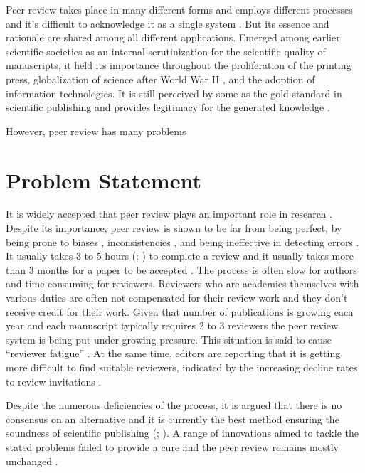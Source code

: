 Peer review takes place in many different forms and employs different processes and it’s difficult to acknowledge it as a single system \parencite[2]{HorbachS.P.J.M..2017}. But its essence and rationale are shared among all different applications. Emerged among earlier scientific societies as an internal scrutinization for the scientific quality of manuscripts, it held its importance throughout the proliferation of the printing press, globalization of science after World War II \parencite{Fyfe.2017}, and the adoption of information technologies. It is still perceived by some as the gold standard in scientific publishing \parencite{Mayden.2012} and provides legitimacy for the generated knowledge \parencite{Tennant.2020c}.

However, peer review has many problems 

\section{Problem Statement} \label{sec:problem-statement}

It is widely accepted that peer review plays an important role in research \parencite{Publons.2018, Taylor&Francis.2015, Ware.2008, Zuckerman.1971}. Despite its importance, peer review is shown to be far from being perfect, by being prone to biases \parencite{Lee.2013, Mahoney.1977}, inconsistencies \parencite{Peters.1982, Rothwell.2000}, and being ineffective in detecting errors \parencite{Schroter.2004}. It usually takes 3 to 5 hours (\cite[146]{Mulligan.2013}; \cite[42]{Ware.2008}) to complete a review and it usually takes more than 3 months for a paper to be accepted \parencite[51]{Ware.2008}. The process is often slow for authors and time consuming for reviewers. Reviewers who are academics themselves with various duties are often not compensated for their review work and they don’t receive credit for their work. Given that number of publications is growing each year \parencite{Bornmann.2015} and each manuscript typically requires 2 to 3 reviewers the peer review system is being put under growing pressure. This situation is said to cause “reviewer fatigue” \parencite{Breuning.2015}. At the same time, editors are reporting that it is getting more difficult to find suitable reviewers, indicated by the increasing decline rates to review invitations \parencite{Baveye.2011, Fox.2017}. 

Despite the numerous deficiencies of the process, it is argued that there is no consensus on an alternative \parencite{Smith.2006, Young.2003} and it is currently the best method ensuring the soundness of scientific publishing (\cite[5201]{Grainger.2007}; \cite[2]{HorbachS.P.J.M..2017}). A range of innovations aimed to tackle the stated problems failed to provide a cure and the peer review remains mostly unchanged \parencite{Tennant.2017}. 


